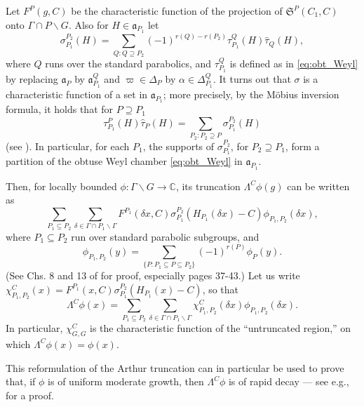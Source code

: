 \documentclass[11pt]{amsart}
\numberwithin{theorem}{section}
\numberwithin{equation}{section}
\theoremstyle{remark}
\theoremstyle{definition}
\newcommand{\C}{\mathbb{C}}
\newcommand{\ga}{\mathfrak{a}}
\begin{document}
Let $F^P(g,C)$ be the characteristic function of the projection of $\mathfrak S^P(C_1,C)$ onto $\Gamma \cap P \backslash G$. Also for $H \in \ga_{P_1}$ let
\begin{equation} \label{eq:sigma}
\sigma_{P_1}^{P_2}(H) = \sum_{Q:Q \supseteq P_2} (-1)^{r(Q)-r(P_2)}\tau_{P_1}^Q(H)\widehat\tau_Q(H),
\end{equation}
where $Q$ runs over the standard parabolics, and $\tau_{P_1}^Q$ is defined as in \eqref{eq:obt_Weyl} by replacing $\ga_P$ by $\ga_{P_1}^Q$ and $\varpi \in \widehat\Delta_P$ by $\alpha \in \Delta_{P_1}^Q$. It turns out that $\sigma$ is a characteristic function of a set in $\ga_{P_1}$; more precisely, by the M\"obius inversion formula, it holds that for $P \supseteq P_1$
\begin{equation*}
\tau_{P_1}^P(H)\widehat\tau_P(H) = \sum_{P_2 : P_2 \supseteq P} \sigma_{P_1}^{P_2}(H)
\end{equation*}
(see \cite[(8.2)]{Art05}). In particular, for each $P_1$, the supports of $\sigma_{P_1}^{P_2}$, for $P_2 \supseteq P_1$, form a partition of the obtuse Weyl chamber \eqref{eq:obt_Weyl} in $\ga_{P_1}$. 

Then, for locally bounded $\phi:\Gamma \backslash G \rightarrow \C$, its truncation $\Lambda^C\phi(g)$ can be written as
\begin{equation*}
\sum_{P_1 \subseteq P_2} \sum_{\delta \in \Gamma \cap P_1 \backslash \Gamma} F^{P_1}(\delta x, C)\sigma_{P_1}^{P_2}(H_{P_1}(\delta x) - C)\phi_{P_1,P_2}(\delta x),
\end{equation*}
where $P_1 \subseteq P_2$ run over standard parabolic subgroups, and
\begin{equation*}
\phi_{P_1,P_2}(y) = \sum_{\{P: P_1 \subseteq P \subseteq P_2\}} (-1)^{r(P)} \phi_P(y).
\end{equation*}
(See Chs. 8 and 13 of \cite{Art05} for proof, especially pages 37-43.) Let us write $\chi_{P_1,P_2}^C(x) = F^{P_1}(x,C)\sigma_{P_1}^{P_2}(H_{P_1}(x)-C)$, so that
\begin{equation}\label{eq:arthur_t_defn2}
\Lambda^C\phi(x) = \sum_{P_1 \subseteq P_2} \sum_{\delta \in \Gamma \cap P_1 \backslash \Gamma} \chi_{P_1,P_2}^C(\delta x)\phi_{P_1,P_2}(\delta x).
\end{equation}
In particular, $\chi_{G,G}^C$ is the characteristic function of the ``untruncated region,'' on which $\Lambda^C \phi(x) = \phi(x)$.

This reformulation of the Arthur truncation can in particular be used to prove that, if $\phi$ is of uniform moderate growth, then $\Lambda^C\phi$ is of rapid decay --- see e.g., \cite[Proposition 13.2]{Art05} for a proof.
\end{document}
